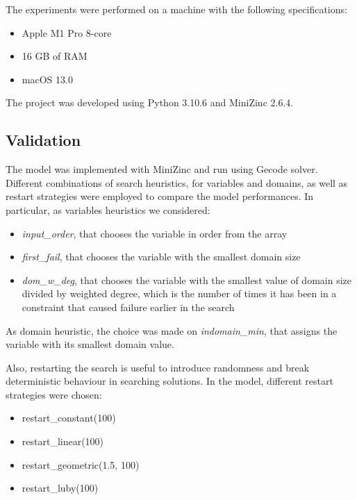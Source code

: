 The experiments were performed on a machine with the following specifications:

\begin{itemize}
    \item Apple M1 Pro 8-core
    \item 16 GB of RAM 
    \item macOS 13.0
\end{itemize}

The project was developed using Python 3.10.6 and MiniZinc 2.6.4.

\subsection{Validation}

The model was implemented with MiniZinc and run using Gecode solver. Different combinations of search heuristics, for variables and domains, as well as restart strategies were employed to compare the model performances. In particular, as variables heuristics we considered:
\begin{itemize}
    \item \textit{input\_order}, that chooses the variable in order from the array
    \item \textit{first\_fail}, that chooses the variable with the smallest domain size
    \item \textit{dom\_w\_deg}, that chooses the variable with the smallest value of domain size divided by weighted degree, which is the number of times it has been in a constraint that caused failure earlier in the search
\end{itemize}

As domain heuristic, the choice was made on \textit{indomain\_min}, that assigns the variable with its smallest domain value.

Also, restarting the search is useful to introduce randomness and break deterministic behaviour in searching solutions. In the model, different restart strategies were chosen:
\begin{itemize}
    \item restart\_constant(100)
    \item restart\_linear(100)
    \item restart\_geometric(1.5, 100)
    \item restart\_luby(100)
\end{itemize}

